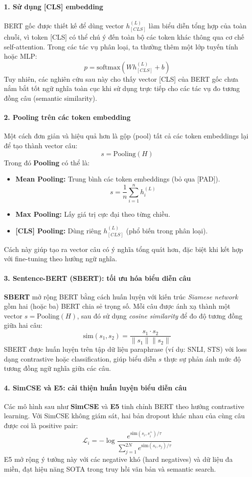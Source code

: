 \paragraph{1. Sử dụng [CLS] embedding}
BERT gốc được thiết kế để dùng vector $h_{[CLS]}^{(L)}$ làm biểu diễn tổng hợp của toàn chuỗi, vì token [CLS] có thể chú ý đến toàn bộ các token khác thông qua cơ chế self-attention. 
Trong các tác vụ phân loại, ta thường thêm một lớp tuyến tính hoặc MLP:
\[
p = \text{softmax}(W h_{[CLS]}^{(L)} + b)
\]
Tuy nhiên, các nghiên cứu sau này cho thấy vector [CLS] của BERT gốc chưa nắm bắt tốt ngữ nghĩa toàn cục khi sử dụng trực tiếp cho các tác vụ đo tương đồng câu (semantic similarity).

\paragraph{2. Pooling trên các token embedding}
Một cách đơn giản và hiệu quả hơn là gộp (pool) tất cả các token embeddings lại để tạo thành vector câu:
\[
s = \text{Pooling}(H)
\]
Trong đó \textbf{Pooling} có thể là:
\begin{itemize}
	\item \textbf{Mean Pooling:} Trung bình các token embeddings (bỏ qua [PAD]).
	\[
	s = \frac{1}{n} \sum_{i=1}^{n} h_i^{(L)}
	\]
	\item \textbf{Max Pooling:} Lấy giá trị cực đại theo từng chiều.
	\item \textbf{[CLS] Pooling:} Dùng riêng $h_{[CLS]}^{(L)}$ (phổ biến trong phân loại).
\end{itemize}
Cách này giúp tạo ra vector câu có ý nghĩa tổng quát hơn, đặc biệt khi kết hợp với fine-tuning theo hướng ngữ nghĩa.

\paragraph{3. Sentence-BERT (SBERT): tối ưu hóa biểu diễn câu}
\textbf{SBERT} \cite{reimers2019sentencebert} mở rộng BERT bằng cách huấn luyện với kiến trúc \textit{Siamese network} gồm hai (hoặc ba) BERT chia sẻ trọng số. Mỗi câu được ánh xạ thành một vector $s = \text{Pooling}(H)$, sau đó sử dụng \textit{cosine similarity} để đo độ tương đồng giữa hai câu:
\[
\text{sim}(s_1, s_2) = \frac{s_1 \cdot s_2}{\|s_1\| \|s_2\|}
\]
SBERT được huấn luyện trên tập dữ liệu paraphrase (ví dụ: SNLI, STS) với loss dạng contrastive hoặc classification, giúp biểu diễn $s$ thực sự phản ánh mức độ tương đồng ngữ nghĩa giữa các câu.

\paragraph{4. SimCSE và E5: cải thiện huấn luyện biểu diễn câu}
Các mô hình sau như \textbf{SimCSE} \cite{gao2021simcse} và \textbf{E5} \cite{wang2022textembeddings} tinh chỉnh BERT theo hướng contrastive learning. 
Với SimCSE không giám sát, hai bản dropout khác nhau của cùng câu được coi là positive pair:
\[
\mathcal{L}_i = -\log \frac{e^{\text{sim}(s_i, s_i^+)/\tau}}{\sum_{j=1}^{2N} e^{\text{sim}(s_i, s_j)/\tau}}
\]
E5 mở rộng ý tưởng này với các negative khó (hard negatives) và dữ liệu đa miền, đạt hiệu năng SOTA trong truy hồi văn bản và semantic search.

